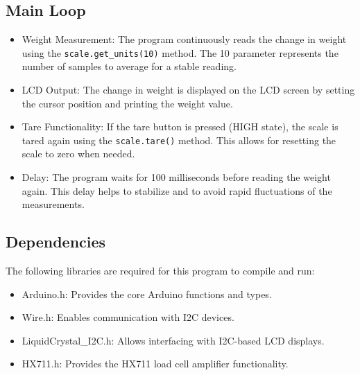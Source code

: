 \subsection{Main Loop}
\begin{itemize}
\item Weight Measurement: The program continuously reads the change in weight using the \texttt{scale.get\_units(10)} method. The 10 parameter represents the number of samples to average for a stable reading.
\item LCD Output: The change in weight is displayed on the LCD screen by setting the cursor position and printing the weight value.
\item Tare Functionality: If the tare button is pressed (HIGH state), the scale is tared again using the \texttt{scale.tare()} method. This allows for resetting the scale to zero when needed.
\item Delay: The program waits for 100 milliseconds before reading the weight again. This delay helps to stabilize and to avoid rapid fluctuations of the measurements.
\end{itemize}

\subsection{Dependencies}
The following libraries are required for this program to compile and run:
\begin{itemize}
\item Arduino.h: Provides the core Arduino functions and types.
\item Wire.h: Enables communication with I2C devices.
\item LiquidCrystal\_I2C.h: Allows interfacing with I2C-based LCD displays.
\item HX711.h: Provides the HX711 load cell amplifier functionality.
\end{itemize}